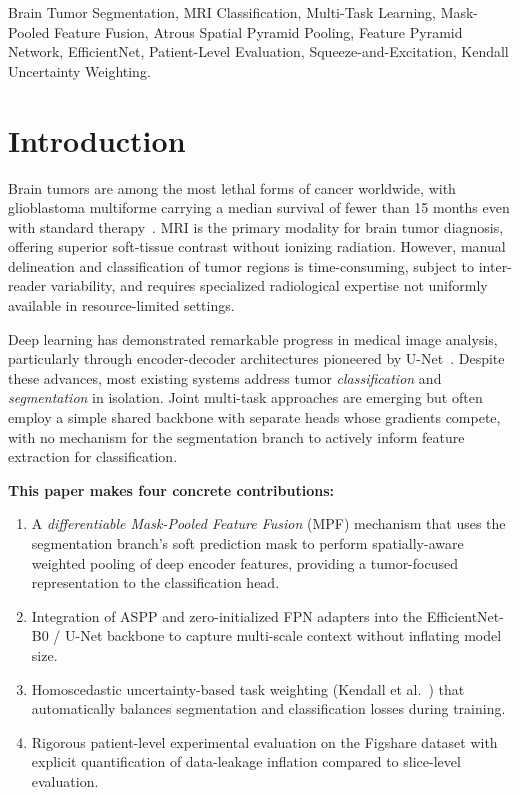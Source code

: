 \documentclass[journal]{IEEEtran}
\begin{document}
\begin{IEEEkeywords}
Brain Tumor Segmentation, MRI Classification, Multi-Task Learning,
Mask-Pooled Feature Fusion, Atrous Spatial Pyramid Pooling,
Feature Pyramid Network, EfficientNet, Patient-Level Evaluation,
Squeeze-and-Excitation, Kendall Uncertainty Weighting.
\end{IEEEkeywords}

\section{Introduction}
\label{sec:intro}

Brain tumors are among the most lethal forms of cancer worldwide, with
glioblastoma multiforme carrying a median survival of fewer than 15 months
even with standard therapy~\cite{menze2015brats}. MRI is the primary
modality for brain tumor diagnosis, offering superior soft-tissue contrast
without ionizing radiation. However, manual delineation and classification
of tumor regions is time-consuming, subject to inter-reader variability, and
requires specialized radiological expertise not uniformly available in
resource-limited settings.

Deep learning has demonstrated remarkable progress in medical image analysis,
particularly through encoder-decoder architectures pioneered by
U-Net~\cite{ronneberger2015unet}. Despite these advances, most existing
systems address tumor \emph{classification} and \emph{segmentation} in
isolation. Joint multi-task approaches are emerging but often employ a simple
shared backbone with separate heads whose gradients compete, with no mechanism
for the segmentation branch to actively inform feature extraction for
classification.

\textbf{This paper makes four concrete contributions:}
\begin{enumerate}
  \item A \emph{differentiable Mask-Pooled Feature Fusion} (MPF) mechanism
        that uses the segmentation branch's soft prediction mask to perform
        spatially-aware weighted pooling of deep encoder features, providing a
        tumor-focused representation to the classification head.
  \item Integration of ASPP and zero-initialized FPN adapters into the
        EfficientNet-B0 / U-Net backbone to capture multi-scale context
        without inflating model size.
  \item Homoscedastic uncertainty-based task weighting (Kendall
        et al.~\cite{kendall2018multitask}) that automatically balances
        segmentation and classification losses during training.
  \item Rigorous patient-level experimental evaluation on the Figshare dataset
        with explicit quantification of data-leakage inflation compared to
        slice-level evaluation.
\end{enumerate}
\end{document}
